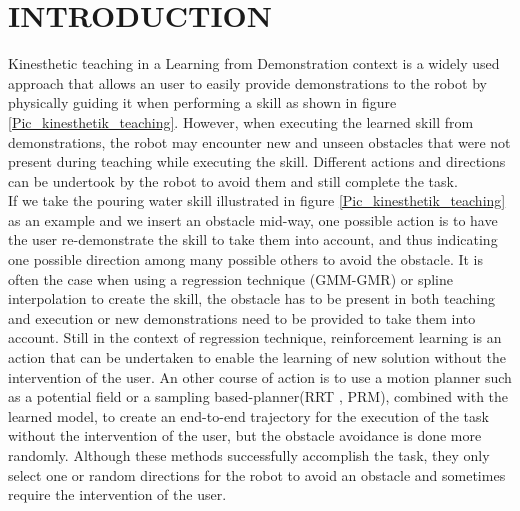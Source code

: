 \documentclass[letterpaper, 10 pt, conference]{ieeeconf}  %
\begin{document}
\section{INTRODUCTION}
Kinesthetic teaching in a Learning from Demonstration context is a widely used approach that allows an user to easily provide demonstrations to the robot by physically guiding it when performing a skill as shown in figure \ref{Pic_kinesthetik_teaching}. However, when executing the learned skill from demonstrations, the robot may encounter new and unseen obstacles that were not present during teaching while executing the skill. Different actions and directions can be undertook by the robot to avoid them  and still complete the task.\\
If we take the pouring water skill illustrated in figure \ref{Pic_kinesthetik_teaching} as an example and we insert an obstacle mid-way, one possible action is to have the user re-demonstrate the skill to take them into account, and thus indicating one possible direction among many possible others to avoid the obstacle. It is often the case when using a regression technique (GMM-GMR) \cite{SylvainLearningGeneralizing} \cite{Calinon15} or spline interpolation \cite{refKeyframe1} to create the skill, the obstacle has to be present in both teaching and execution or new demonstrations need to be provided to take them into account. Still in the context of regression technique, reinforcement learning is an action that can be undertaken to enable the learning of new solution without the intervention of the user\cite{ReinforcementLearningAude}. 
An other course of action is to use a motion planner such as a potential field \cite{PotentialField} or a sampling based-planner(RRT \cite{RRTandLFD}, PRM\cite{ModelAndPRM}), combined with the learned model, to create an end-to-end trajectory for the execution of the task without the intervention of the user, but the obstacle avoidance is done more randomly. Although these methods successfully accomplish the task, they only select one or random directions for the robot to avoid an obstacle and sometimes require the intervention of the user.\\
\end{document}

